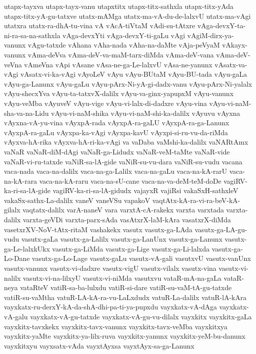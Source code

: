 {utapx-tayxva
utapx-tayx-vanu
utapxtitx
utapx-titx-sathxla
utapx-titx-yAda
utapx-titx-yA-gu-tatxve
utatx-mAMga
utatx-ma-vA-du-de-lalxvU
utatx-ma-vAgi
utatxra
utatx-ra-dhA-tu-vina
vA
vAcA-tiVtaM
vAdi-su-tAtxre
vAga-devxY-ta-ni-ra-sa-na-sathxla
vAga-devxYti
vAga-devxY-ti-gaLu
vAgi
vAgiM-dirx-ya-vanunx
vAgu-tatxde
vAhana
vAha-nada
vAha-na-daMte
vAja-peVyaM
vAkayx-vanunx
vAma-deVva
vAma-deV-va-maM-tarx-diMda
vAma-deV-vana
vAma-deV-veVna
vAmeVna
vApi
vAsane
vAsa-ne-ga-Le-lalxvU
vAsa-ne-yanunx
vAsatx-va-vAgi
vAsatx-vi-ka-vAgi
vAyoLeV
vAyu
vAyu-BUtaM
vAyu-BU-tada
vAyu-gaLa
vAyu-ga-Lanunx
vAyu-gaLu
vAyu-pArx-Ni-yA-gi-dadx-vanu
vAyu-pArx-Ni-yalalx
vAyu-shecxYva
vAyu-ta-tatxvX-dalilx
vAyu-va-ginx-yapupxM
vAyu-vanunx
vAyu-veMba
vAyuveV
vAyu-vige
vAyu-vi-lalx-di-dadxre
vAyu-vina
vAyu-vi-naM-sha-va-na-Lidu
vAyu-vi-naM-shika
vAyu-vi-naM-shi-ka-dalilx
vAyuvu
vAyxna
vAyxna-vA-yu-vina
vAyxpA-rada
vAyxpA-ra-gaLU
vAyxpA-ra-ga-Lanunx
vAyxpA-ra-gaLu
vAyxpa-ka-vAgi
vAyxpa-kavU
vAyxpi-si-ru-vu-da-riMda
vAyxva-hA-rika
vAyxva-hA-ri-ka-vAgi
va
vaDaba
vaMshi-ka-dalilx
vaNARtAmx
vaNaR
vaNaR-diM-dAgi
vaNaR-ga-Lidudx
vaNaR-veM-taMte
vaNaR-vide
vaNaR-vi-ru-tatxde
vaNiR-sa-lA-gide
vaNiR-su-vu-dara
vaNiR-su-vudu
vacana
vaca-nada
vaca-na-dalilx
vaca-na-ga-Lalilx
vaca-na-gaLu
vaca-na-kA-rarU
vaca-na-kA-rara
vaca-na-kA-raru
vaca-na-sU-cane
vaca-na-va-deM-teM-doDe
vagiRV-ka-ri-sa-lA-gide
vagiRV-ka-ri-sa-lA-gidudx
vajayxR
vajiRsi
vakaSxH-sathxleV
vakaSx-sathx-La-dalilx
vaneV
vaneVSu
vapakoV
vaqtAtx-kA-ra-vi-ra-beV-kA-gilalx
vaqtatx-dalilx
varA-naneV
vara
varxtA-cA-rakekx
varxta
varxtada
varxta-dalilx
varxta-geVDi
varxta-parx-sAda
vasAtxrX-laM-kAra
vasatxrX-diMda
vasetxrXV-NoV-tAtx-ritaM
vashakekx
vasutx
vasutx-ga-LAda
vasutx-ga-LA-gu-vudu
vasutx-gaLa
vasutx-ga-Lalilx
vasutx-ga-LanUnx
vasutx-ga-Lanunx
vasutx-ga-Le-lalxkUkx
vasutx-ga-LiMda
vasutx-ga-Lige
vasutx-ga-Li-lalxda
vasutx-ga-Lo-Dane
vasutx-ga-Lo-Lage
vasutx-gaLu
vasutx-vA-gali
vasutxvU
vasutx-vanUnx
vasutx-vanunx
vasutx-vi-dadxre
vasutx-vigU
vasutx-vilalx
vasutx-vina
vasutx-vi-nalilx
vasutx-vi-na-lilxyU
vasutx-vi-niMda
vasutxvu
vataR-mA-na-gaLa
vataR-neya
vataRteV
vatiR-sa-ba-lulxdu
vatiR-si-dare
vatiR-su-vaM-tA-gu-tatxde
vatiR-su-vaMtha
vatuR-LA-kA-ra-vu-LaLxdudx
vatuR-La-dalilx
vatuR-lA-kAra
vayxkatx-ru-derxY-kA-da-shA-dhi-pa-ti-ya-pupxdu
vayxkatx-vA-dAga
vayxkatx-vA-galu
vayxkatx-vA-gu-tatxde
vayxkatx-vA-gu-vu-dilalx
vayxkitx
vayxkitx-gaLa
vayxkitx-tavxkekx
vayxkitx-tavx-vanunx
vayxkitx-tavx-veMba
vayxkitxya
vayxkitx-yaMte
vayxkitx-ya-lilx-ruva
vayxkitx-yanunx
vayxkitx-yeM-bu-danunx
vayxkitxyu
vayxsatx-vAda
vayxtAyxsa
vayxtAyx-sa-ga-Lanunx
}
